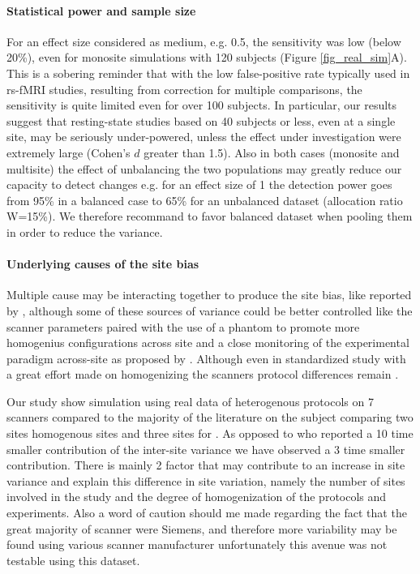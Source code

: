 \documentclass[authoryear]{elsarticle}
\begin{document}
\paragraph{Statistical power and sample size} For an effect size considered as medium, e.g. 0.5, the sensitivity was low (below 20\%), even for monosite simulations with 120 subjects (Figure \ref{fig_real_sim}A). This is a sobering reminder that with the low false-positive rate typically used in rs-fMRI studies, resulting from correction for multiple comparisons, the sensitivity is quite limited even for over 100 subjects. In particular, our results suggest that resting-state studies based on 40 subjects or less, even at a single site, may be seriously under-powered, unless the effect under investigation were extremely large (Cohen's $d$ greater than 1.5). Also in both cases (monosite and multisite) the effect of unbalancing the two populations may greatly reduce our capacity to detect changes e.g. for an effect size of 1 the detection power goes from 95\% in a balanced case to 65\% for an unbalanced dataset (allocation ratio W=15\%). We therefore recommand to favor balanced dataset when pooling them in order to reduce the variance.

\paragraph{Underlying causes of the site bias}
Multiple cause may be interacting together to produce the site bias, like reported by \cite{Yan2013a}, although some of these sources of variance could be better controlled like the scanner parameters paired with the use of a phantom to promote more homogenius configurations across site and a close monitoring of the experimental paradigm across-site as proposed by \cite{Friedman2006,Friedman2006a,Glover2012}. Although even in standardized study with a great effort made on homogenizing the scanners protocol differences remain \cite{Brown2011}. 

Our study show simulation using real data of heterogenous protocols on 7 scanners compared to the majority of the literature on the subject comparing two sites homogenous sites \citep{Costafreda2007,Suckling2008,Sutton2008,Glover2012} and three sites for \cite{Gountouna2010}. As opposed to \cite{Sutton2008,Brown2011} who reported a 10 time smaller contribution of the inter-site variance we have observed a 3 time smaller contribution. There is mainly 2 factor that may contribute to an increase in site variance and explain this difference in site variation, namely the number of sites involved in the study and the degree of homogenization of the protocols and experiments. Also a word of caution should me made regarding the fact that the great majority of scanner were Siemens, and therefore more variability may be found using various scanner manufacturer unfortunately this avenue was not testable using this dataset.
\end{document}
